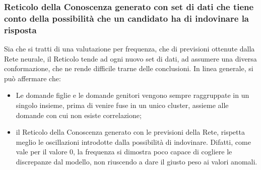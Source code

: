 \subsubsection{Reticolo della Conoscenza generato con set di dati che tiene conto della possibilit\`a che un candidato ha di indovinare la risposta}
\label{Reticolo della Conoscenza generato con set di dati che tiene conto della possibilita che un candidato ha di indovinare la risposta}
Sia che si tratti di una valutazione per frequenza, che di previsioni ottenute dalla Rete neurale, il Reticolo tende ad ogni nuovo set di dati, ad assumere una diversa conformazione, che ne rende difficile trarne delle conclusioni.
In linea generale, si pu\`o affermare che:
\begin{itemize}
\item Le domande figlie e le domande genitori vengono sempre raggruppate in un singolo insieme, prima di venire fuse in un unico cluster, assieme alle domande con cui non esiste correlazione;
\item il Reticolo della Conoscenza generato con le previsioni della Rete, rispetta meglio le oscillazioni introdotte dalla possibilit\`a di indovinare. Difatti, come vale per il valore 0, la frequenza si dimostra poco capace di cogliere le discrepanze dal modello, non riuscendo a dare il giusto peso ai valori anomali.
\end{itemize}

